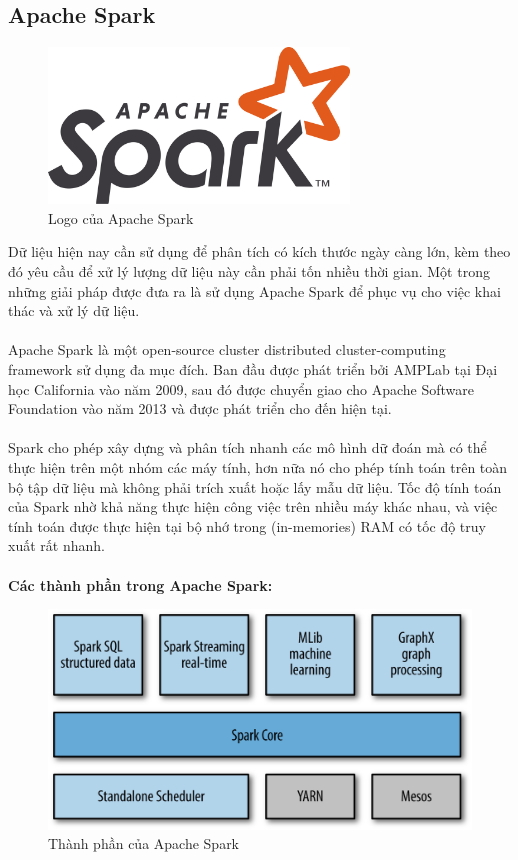 \documentclass[11pt,a4paper]{article}
\begin{document}
\subsection{Apache Spark\cite{SPARK_WIKI}}
\begin{figure}[h]
    \centering
    \includegraphics[width=8cm]{fig/Apache_Spark_logo.png}
    \caption{Logo của Apache Spark}
    \label{fig:apache_spark}
\end{figure}
Dữ liệu hiện nay cần sử dụng để phân tích có kích thước ngày càng lớn, kèm theo đó yêu cầu để xử lý lượng dữ liệu này cần phải tốn nhiều thời gian. Một trong những giải pháp được đưa ra là sử dụng Apache Spark để phục vụ cho việc khai thác và xử lý dữ liệu. \\
\\
Apache Spark\cite{SPARK_WIKI} là một open-source cluster distributed cluster-computing framework sử dụng đa mục đích. Ban đầu được phát triển bởi AMPLab tại Đại học California vào năm 2009, sau đó được chuyển giao cho Apache Software Foundation vào năm 2013 và được phát triển cho đến hiện tại.\\
\\
Spark cho phép xây dựng và phân tích nhanh các mô hình dữ đoán mà có thể thực hiện trên một nhóm các máy tính, hơn nữa nó cho phép tính toán trên toàn bộ tập dữ liệu mà không phải trích xuất hoặc lấy mẫu dữ liệu. Tốc độ tính toán của Spark nhờ khả năng thực hiện công việc trên nhiều máy khác nhau, và việc tính toán được thực hiện tại bộ nhớ trong (in-memories) RAM có tốc độ truy xuất rất nhanh.\\
\\
\textbf{Các thành phần trong Apache Spark:\cite{orielly}}
\begin{figure}
    \centering
    \includegraphics[width=14cm]{fig/lnsp_0101.png}
    \caption{Thành phần của Apache Spark\cite{orielly}}
    \label{fig:spark_compnent}
\end{figure}
\end{document}
